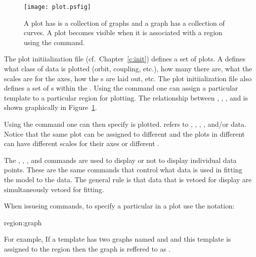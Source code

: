 \begin{figure}
  \centering
  \texttt{[image: plot.psfig]}
  \caption{A plot has is a collection of graphs and a graph has a 
collection of curves. A plot becomes visible when it 
is associated with a region using the  command.}
  \label{f:plot}
\end{figure}

The plot initiialization file (cf.~Chapter~\ref{c:init}) defines a set
of  plots. A  defines what class of data is
plotted (orbit, coupling, etc.), how many  there are, what
the scales are for the  axes, how the s are laid
out, etc.  The plot initiialization file also defines a set of
s within the .  Using the  command one
can assign a particular template to a particular region for plotting.
The relationship between , , , and
 is shown graphically in Figure~\ref{f:plot}.

Using the  command one can then specify  is
plotted.  refers to , , ,
, and/or  data.  Notice that the same 
plot can be assigned to different  and the plots in different
 can have different scales for their axes or different
.


The , , ,
and  commands are used to display or not to display
individual data points. These are the same commands that control what
data is used in fitting the model to the data. The general rule is
that data that is vetoed for display are simultaneously vetoed for fitting.

When issueing \tao commands, to specify a particular  in a plot
use the notation:
\begin{example}
  region:graph
\end{example}
For example, If a template has two graphs named  and  and
this template is assigned to the  region then the  graph
is reffered to as . 

